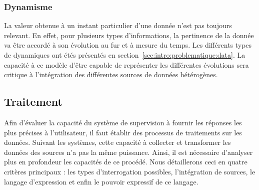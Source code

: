 \subsubsection{Dynamisme}
La valeur obtenue à un instant particulier d'une donnée n'est pas toujours relevant. En effet, pour plusieurs types d'informations, la pertinence de la donnée va être accordé à son évolution au fur et à mesure du temps. Les différents types de dynamiques ont étés présentés en section~\ref{sec:intro:problematique:data}. La capacité à ce modèle d'être capable de représenter les différentes évolutions sera critique à l'intégration des différentes sources de données hétérogènes.

\subsection{Traitement}\label{sec:rw:supervision:criteres:traitement}
Afin d'évaluer la capacité du système de supervision à fournir les réponses les plus précises à l'utilisateur, il faut établir des processus de traitements sur les données. Suivant les systèmes, cette capacité à collecter et transformer les données des sources n'a pas la même puissance. Ainsi, il est nécessaire d'analyser plus en profondeur les capacités de ce procédé. Nous détaillerons ceci en quatre critères principaux : les types d'interrogation possibles, l'intégration de sources, le langage d'expression et enfin le pouvoir expressif de ce langage.


